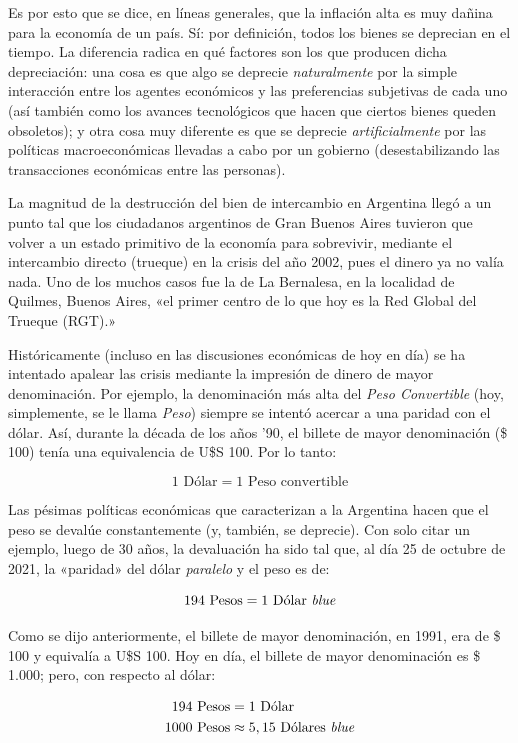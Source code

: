 \documentclass[12pt,a4paper,twoside]{book}
\begin{document}
Es por esto que se dice, en líneas generales, que la inflación alta es muy dañina para la economía de un país. Sí: por definición, todos los bienes se deprecian en el tiempo. La diferencia radica en qué factores son los que producen dicha depreciación: una cosa es que algo se deprecie \textit{naturalmente} por la simple interacción entre los agentes económicos y las preferencias subjetivas de cada uno (así también como los avances tecnológicos que hacen que ciertos bienes queden obsoletos); y otra cosa muy diferente es que se deprecie \textit{artificialmente} por las políticas macroeconómicas llevadas a cabo por un gobierno (desestabilizando las transacciones económicas entre las personas).

La magnitud de la destrucción del bien de intercambio en Argentina llegó a un punto tal que los ciudadanos argentinos de Gran Buenos Aires tuvieron que volver a un estado primitivo de la economía para sobrevivir, mediante el intercambio directo (trueque) en la crisis del año 2002, pues el dinero ya no valía nada. Uno de los muchos casos fue la de La Bernalesa, en la localidad de Quilmes, Buenos Aires, «el primer centro de lo que hoy es la Red Global del Trueque (RGT).» \cite{arg:trueque}

Históricamente (incluso en las discusiones económicas de hoy en día) se ha intentado apalear las crisis mediante la impresión de dinero de mayor denominación. Por ejemplo, la denominación más alta del \textit{Peso Convertible} (hoy, simplemente, se le llama \textit{Peso}) siempre se intentó acercar a una paridad con el dólar. Así, durante la década de los años '90, el billete de mayor denominación (\$ 100) tenía una equivalencia de U\$S 100. Por lo tanto:

\[
1 \text{ Dólar} = 1 \text{ Peso convertible}
\]

Las pésimas políticas económicas que caracterizan a la Argentina hacen que el peso se devalúe constantemente (y, también, se deprecie). Con solo citar un ejemplo, luego de 30 años, la devaluación ha sido tal que, al día 25 de octubre de 2021, la «paridad» del dólar \textit{paralelo} y el peso es de:

\[
194 \text{ Pesos} = 1 \text{ Dólar \textit{blue}}
\]

Como se dijo anteriormente, el billete de mayor denominación, en 1991, era de \$ 100 y equivalía a U\$S 100. Hoy en día, el billete de mayor denominación es \$ 1.000; pero, con respecto al dólar:

\begin{align*}
194 \text{ Pesos} &= 1 \text{ Dólar} \\
1000 \text{ Pesos} & \approx 5,15 \text{ Dólares \textit{blue}}
\end{align*}
\end{document}
